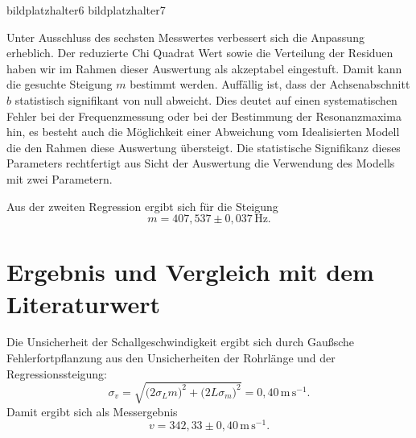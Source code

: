 \documentclass[11pt,a4paper]{article}
\begin{document}
bildplatzhalter{6}
bildplatzhalter{7}

\begin{table}[H]
  \centering
  \caption{Ergebnisse der zweiten linearen Regression unter Ausschluss des sechsten Messwertes.}
  \label{tab:regression2}
  \vspace{0.4em}
  \par\vspace{0.5em}
\end{table}

Unter Ausschluss des sechsten Messwertes verbessert sich die Anpassung erheblich. Der reduzierte Chi Quadrat Wert sowie die Verteilung der Residuen haben wir im Rahmen dieser Auswertung als akzeptabel eingestuft. Damit kann die gesuchte Steigung $m$ bestimmt werden. Auffällig ist, dass der Achsenabschnitt $b$ statistisch signifikant von null abweicht. Dies deutet auf einen systematischen Fehler bei der Frequenzmessung oder bei der Bestimmung der Resonanzmaxima hin, es besteht auch die Möglichkeit einer Abweichung vom Idealisierten Modell die den Rahmen diese Auswertung übersteigt. Die statistische Signifikanz dieses Parameters rechtfertigt aus Sicht der Auswertung die Verwendung des Modells mit zwei Parametern.

Aus der zweiten Regression ergibt sich für die Steigung
\begin{equation}
  m = 407{,}537\pm0{,}037\,\mathrm{Hz}.
  \label{eq:steigung}
\end{equation}

\section{Ergebnis und Vergleich mit dem Literaturwert}

Die Unsicherheit der Schallgeschwindigkeit ergibt sich durch Gaußsche Fehlerfortpflanzung aus den Unsicherheiten der Rohrlänge und der Regressionssteigung:
\begin{equation}
  \sigma_v
  = \sqrt{\bigl(2\sigma_L m\bigr)^2 + \bigl(2 L\sigma_m\bigr)^2}
  = \mathrm{0{,}40\,m\,s^{-1}}.
  \label{eq:fehlerfortpflanzung}
\end{equation}
Damit ergibt sich als Messergebnis
\begin{equation}
  \boxed{v = 342{,}33\pm0{,}40\,\mathrm{m\,s^{-1}}.}
  \label{eq:ergebnis}
\end{equation}
\end{document}
